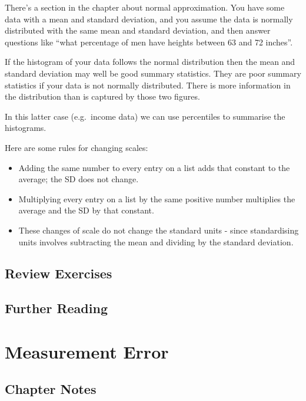 \documentclass[
]{book}
\providecommand{\tightlist}{%
  \setlength{\itemsep}{0pt}\setlength{\parskip}{0pt}}
\begin{document}
There's a section in the chapter about normal approximation. You have some data with a mean and standard deviation, and you assume the data is normally distributed with the same mean and standard deviation, and then answer questions like ``what percentage of men have heights between 63 and 72 inches''.

If the histogram of your data follows the normal distribution then the mean and standard deviation may well be good summary statistics. They are poor summary statistics if your data is not normally distributed. There is more information in the distribution than is captured by those two figures.

In this latter case (e.g.~income data) we can use percentiles to summarise the histograms.

Here are some rules for changing scales:

\begin{itemize}
\tightlist
\item
  Adding the same number to every entry on a list adds that constant to the average; the SD does not change.
\item
  Multiplying every entry on a list by the same positive number multiplies the average and the SD by that constant.
\item
  These changes of scale do not change the standard units - since standardising units involves subtracting the mean and dividing by the standard deviation.
\end{itemize}

\hypertarget{review-exercises-3}{%
\section{Review Exercises}\label{review-exercises-3}}

\hypertarget{further-reading-4}{%
\section*{Further Reading}\label{further-reading-4}}

\hypertarget{measurement_error}{%
\chapter{Measurement Error}\label{measurement_error}}

\hypertarget{chapter-notes-5}{%
\section{Chapter Notes}\label{chapter-notes-5}}
\end{document}
